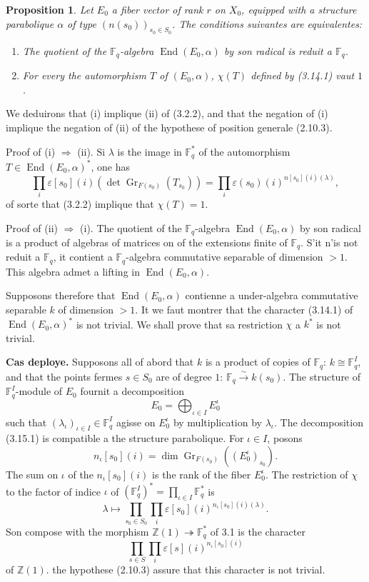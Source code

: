 \documentclass[11pt,a4paper]{article}
\theoremstyle{plain}
\newtheorem{proposition}[theorem]{Proposition}
\theoremstyle{definition}
\DeclareMathOperator{\End}{End}
\DeclareMathOperator{\Gri}{Gr}
\newcommand{\Z}{\mathbb{Z}}
\newcommand{\F}{\mathbb{F}}
\begin{document}
\begin{proposition}
Let $E_0$ a fiber vector of rank $r$ on $X_0$, equipped with a structure parabolique $\alpha$ of type $(n(s_0))_{s_0 \in S_0}$. The conditions suivantes are equivalentes:
\begin{enumerate}[label=(\roman*)]
\item The quotient of the $\F_q$-algebra $\End(E_0, \alpha)$ by son radical is reduit a $\F_q$.
\item For every the automorphism $T$ of $(E_0, \alpha)$, $\chi(T)$ defined by (3.14.1) vaut $1$.
\end{enumerate}
\end{proposition}

We deduirons that (i) implique (ii) of (3.2.2), and that the negation of (i) implique the negation of (ii) of the hypothese of position generale (2.10.3).

Proof of (i) $\Rightarrow$ (ii). Si $\lambda$ is the image in $\F_q^*$ of the automorphism $T \in \End(E_0, \alpha)^*$, one has
\[
\prod_i \varepsilon[s_0](i)(\det \Gri_{F(s_0)}(T_{s_0})) = \prod_i \varepsilon(s_0)(i)^{n[s_0](i)(\lambda)},
\]
of sorte that (3.2.2) implique that $\chi(T) = 1$.

Proof of (ii) $\Rightarrow$ (i). The quotient of the $\F_q$-algebra $\End(E_0, \alpha)$ by son radical is a product of algebras of matrices on of the extensions finite of $\F_q$. S'it n'is not reduit a $\F_q$, it contient a $\F_q$-algebra commutative separable of dimension $> 1$. This algebra admet a lifting in $\End(E_0, \alpha)$.

Supposons therefore that $\End(E_0, \alpha)$ contienne a under-algebra commutative separable $k$ of dimension $> 1$. It we faut montrer that the character (3.14.1) of $\End(E_0, \alpha)^*$ is not trivial. We shall prove that sa restriction $\chi$ a $k^*$ is not trivial.

\textbf{Cas deploye.} Supposons all of abord that $k$ is a product of copies of $\F_q$: $k \cong \F_q^I$, and that the points fermes $s \in S_0$ are of degree $1$: $\F_q \xrightarrow{\sim} k(s_0)$. The structure of $\F_q^I$-module of $E_0$ fournit a decomposition
\begin{equation}
E_0 = \bigoplus_{\iota \in I} E_0^\iota
\tag{3.15.1}
\end{equation}
such that $(\lambda_\iota)_{\iota \in I} \in \F_q^I$ agisse on $E_0^\iota$ by multiplication by $\lambda_\iota$. The decomposition (3.15.1) is compatible a the structure parabolique. For $\iota \in I$, posons
\[
n_\iota[s_0](i) = \dim \Gri_{F(s_0)}((E_0^\iota)_{s_0}).
\]
The sum on $\iota$ of the $n_\iota[s_0](i)$ is the rank of the fiber $E_0^\iota$. The restriction of $\chi$ to the factor of indice $\iota$ of $(\F_q^I)^* = \prod_{\iota \in I} \F_q^*$ is
\begin{equation}
\lambda \mapsto \prod_{s_0 \in S_0} \prod_i \varepsilon[s_0](i)^{n_\iota[s_0](i)(\lambda)}.
\tag{3.15.2}
\end{equation}
Son compose with the morphism $\Z(1) \twoheadrightarrow \F_q^*$ of 3.1 is the character
\[
\prod_{s \in S} \prod_i \varepsilon[s](i)^{n_\iota[s_0](i)}
\]
of $\Z(1)$. the hypothese (2.10.3) assure that this character is not trivial.
\end{document}
